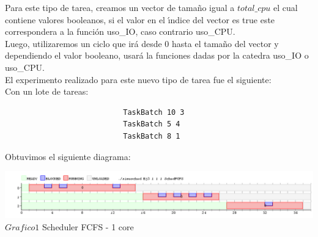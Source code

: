  \indent Para este tipo de tarea, creamos un vector de tamaño igual a $total\_cpu$ el cual contiene valores booleanos, 
 si el valor en el \'{\i}ndice del vector es true este correspondera a la funci\'{o}n uso\_IO, caso contrario uso\_CPU.\\
 Luego, utilizaremos un ciclo que irá desde 0 hasta el tamaño del vector y dependiendo el valor booleano, usará la funciones
 dadas por la catedra uso\_IO o uso\_CPU.\\
 
 \indent El experimento realizado para este nuevo tipo de tarea fue el siguiente:\\
 
 Con un lote de tareas:\\
 
 \begin{verbatim}
                           TaskBatch 10 3
                           TaskBatch 5 4
                           TaskBatch 8 1
 \end{verbatim}

 Obtuvimos el siguiente diagrama:\\
 
 \vspace*{0.3cm} \vspace*{0.3cm}
  \begin{center}
 \includegraphics[scale=0.5]{./Test/ej3.png}
 { $Grafico 1$ Scheduler FCFS - 1 core }
 \end{center}
  \vspace*{0.3cm}
 
